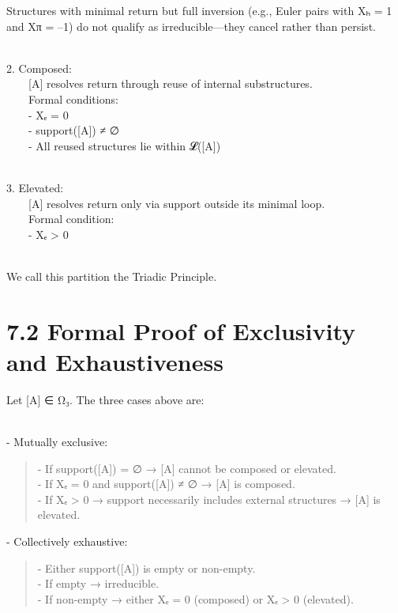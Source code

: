 Structures with minimal return but full inversion (e.g., Euler pairs
with Xₕ = 1 and Xπ = --1) do not qualify as irreducible---they cancel
rather than persist.\\
\strut \\
2. Composed:\\
  {[}A{]} resolves return through reuse of internal substructures.\\
  Formal conditions:\\
  - Xₑ = 0\\
  - support({[}A{]}) ≠ ∅\\
  - All reused structures lie within 𝓛({[}A{]})\\
\strut \\
3. Elevated:\\
  {[}A{]} resolves return only via support outside its minimal loop.\\
  Formal condition:\\
  - Xₑ \textgreater{} 0\\
\strut \\
We call this partition the Triadic Principle.

\section{7.2 \textbar{} Formal Proof of Exclusivity and
Exhaustiveness}\label{formal-proof-of-exclusivity-and-exhaustiveness}

Let {[}A{]} ∈ Ω₃. The three cases above are:\\
\strut \\
- Mutually exclusive:

\begin{quote}
- If support({[}A{]}) = ∅ → {[}A{]} cannot be composed or elevated.\\
- If Xₑ = 0 and support({[}A{]}) ≠ ∅ → {[}A{]} is composed.\\
- If Xₑ \textgreater{} 0 → support necessarily includes external
structures → {[}A{]} is elevated.
\end{quote}

- Collectively exhaustive:

\begin{quote}
- Either support({[}A{]}) is empty or non-empty.\\
- If empty → irreducible.\\
- If non-empty → either Xₑ = 0 (composed) or Xₑ \textgreater{} 0
(elevated).
\end{quote}

